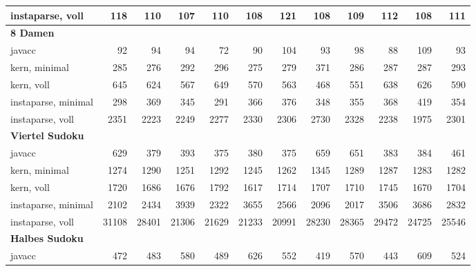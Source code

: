 \documentclass[ngerman,a4paper,abstracton,open=right,twoside=false,toc=listofnumbered,bibtotocnumbered]{scrreprt}
\begin{document}
\begin{table}[!h]
{{\begin{tabular}{|l|r|r|r|r|r|r|r|r|r|r|r|}
				instaparse, voll   & 118 & 110 & 107 & 110 & 108 & 121 & 108 & 109 & 112 & 108 & 111 \\ \hline
				\textbf{8 Damen} & \multicolumn{1}{l|}{} & \multicolumn{1}{l|}{} & \multicolumn{1}{l|}{} & \multicolumn{1}{l|}{} & \multicolumn{1}{l|}{} & \multicolumn{1}{l|}{} & \multicolumn{1}{l|}{} & \multicolumn{1}{l|}{} & \multicolumn{1}{l|}{} & \multicolumn{1}{l|}{} & \multicolumn{1}{l|}{} \\ \hline
				javacc  & 92 & 94 & 94 & 72 & 90 & 104 & 93 & 98 & 88 & 109 & 93 \\ \hline
				kern, minimal   & 285 & 276 & 292 & 296 & 275 & 279 & 371 & 286 & 287 & 287 & 293 \\ \hline
				kern, voll   & 645 & 624 & 567 & 649 & 570 & 563 & 468 & 551 & 638 & 626 & 590 \\ \hline
				instaparse, minimal   & 298 & 369 & 345 & 291 & 366 & 376 & 348 & 355 & 368 & 419 & 354 \\ \hline
				instaparse, voll   & 2351 & 2223 & 2249 & 2277 & 2330 & 2306 & 2730 & 2328 & 2238 & 1975 & 2301 \\ \hline
				\textbf{Viertel Sudoku} & \multicolumn{1}{l|}{} & \multicolumn{1}{l|}{} & \multicolumn{1}{l|}{} & \multicolumn{1}{l|}{} & \multicolumn{1}{l|}{} & \multicolumn{1}{l|}{} & \multicolumn{1}{l|}{} & \multicolumn{1}{l|}{} & \multicolumn{1}{l|}{} & \multicolumn{1}{l|}{} & \multicolumn{1}{l|}{} \\ \hline
				javacc  & 629 & 379 & 393 & 375 & 380 & 375 & 659 & 651 & 383 & 384 & 461 \\ \hline
				kern, minimal   & 1274 & 1290 & 1251 & 1292 & 1245 & 1262 & 1345 & 1289 & 1287 & 1283 & 1282 \\ \hline
				kern, voll   & 1720 & 1686 & 1676 & 1792 & 1617 & 1714 & 1707 & 1710 & 1745 & 1670 & 1704 \\ \hline
				instaparse, minimal   & 2102 & 2434 & 3939 & 2322 & 3655 & 2566 & 2096 & 2017 & 3506 & 3686 & 2832 \\ \hline
				instaparse, voll   & 31108 & 28401 & 21306 & 21629 & 21233 & 20991 & 28230 & 28365 & 29472 & 24725 & 25546 \\ \hline
				\textbf{Halbes Sudoku} & \multicolumn{1}{l|}{} & \multicolumn{1}{l|}{} & \multicolumn{1}{l|}{} & \multicolumn{1}{l|}{} & \multicolumn{1}{l|}{} & \multicolumn{1}{l|}{} & \multicolumn{1}{l|}{} & \multicolumn{1}{l|}{} & \multicolumn{1}{l|}{} & \multicolumn{1}{l|}{} & \multicolumn{1}{l|}{} \\ \hline
				javacc  & 472 & 483 & 580 & 489 & 626 & 552 & 419 & 570 & 443 & 609 & 524 \\ \hline

\end{tabular}}}
\end{table}
\end{document}
